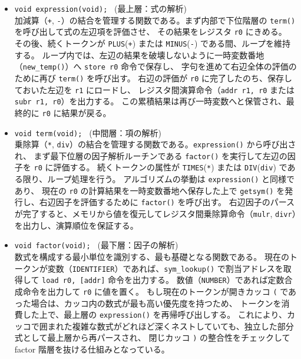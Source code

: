\documentclass[11pt,a4paper,dvipdfmx]{bxjsarticle}
\begin{document}
\begin{itemize}
    \item \texttt{void expression(void); } (最上層：式の解析) \\
    加減算（\texttt{+}, \texttt{-}）の結合を管理する関数である。まず内部で下位階層の \texttt{term()} を呼び出して式の左辺項を評価させ、
    その結果をレジスタ \texttt{r0} にきめる。
    その後、続くトークンが \texttt{PLUS}(\texttt{+}) または \texttt{MINUS}(\texttt{-}) である間、ループを維持する。
    ループ内では、左辺の結果を破壊しないように一時変数番地（\texttt{new\_temp()}）へ \texttt{store r0} 命令で保存し、
    字句を進めて右辺全体の評価のために再び \texttt{term()} を呼び出す。
    右辺の評価が \texttt{r0} に完了したのち、保存しておいた左辺を \texttt{r1} にロードし、
    レジスタ間演算命令（\texttt{addr r1, r0} または \texttt{subr r1, r0}）を出力する。
    この累積結果は再び一時変数へと保管され、最終的に \texttt{r0} に結果が戻る。
    
    \item \texttt{void term(void); } (中間層：項の解析) \\
    乗除算（\texttt{*}, \texttt{div}）の結合を管理する関数である。\texttt{expression()} から呼び出され、
    まず最下位層の因子解析ルーチンである \texttt{factor()} を実行して左辺の因子を \texttt{r0} に評価する。
    続くトークンの属性が \texttt{TIMES}(\texttt{*}) または \texttt{DIV}(\texttt{div}) である限り、ループ処理を行う。
    アルゴリズムの挙動は \texttt{expression()} と同様であり、
    現在の \texttt{r0} の計算結果を一時変数番地へ保存した上で \texttt{getsym()} を発行し、右辺因子を評価するために \texttt{factor()} を呼び出す。
    右辺因子のパースが完了すると、メモリから値を復元してレジスタ間乗除算命令（\texttt{mulr}, \texttt{divr}）を出力し、演算順位を保証する。
    
    \item \texttt{void factor(void); } (最下層：因子の解析) \\
    数式を構成する最小単位を識別する、最も基礎となる関数である。
    現在のトークンが変数（\texttt{IDENTIFIER}）であれば、\texttt{sym\_lookup()} で割当アドレスを取得して \texttt{load r0, [addr]} 命令を出力する。
    数値（\texttt{NUMBER}）であれば定数合成命令を出力して \texttt{r0} に値を置く。
    もし現在のトークンが開きカッコ \texttt{(} であった場合は、カッコ内の数式が最も高い優先度を持つため、
    トークンを消費した上で、最上層の \texttt{expression()} を再帰呼び出しする。
    これにより、カッコで囲まれた複雑な数式がどれほど深くネストしていても、独立した部分式として最上層から再パースされ、
    閉じカッコ \texttt{)} の整合性をチェックして factor 階層を抜ける仕組みとなっている。
\end{itemize}
\end{document}
